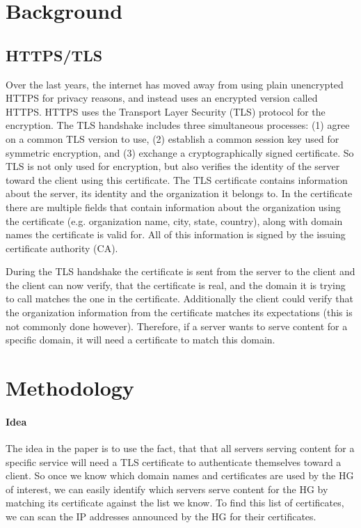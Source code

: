 \documentclass[sigconf,10pt,nonacm]{acmart}
\begin{document}
\section{Background}

\subsection{HTTPS/TLS}

Over the last years, the internet has moved away from using plain unencrypted HTTPS for privacy reasons, and instead uses an encrypted version called HTTPS. HTTPS uses the Transport Layer Security (TLS) protocol for the encryption. The TLS handshake includes three simultaneous processes: (1) agree on a common TLS version to use, (2) establish a common session key used for symmetric encryption, and (3) exchange a cryptographically signed certificate. So TLS is not only used for encryption, but also verifies the identity of the server toward the client using this certificate. The TLS certificate contains information about the server, its identity and the organization it belongs to. In the certificate there are multiple fields that contain information about the organization using the certificate (e.g. organization name, city, state, country), along with domain names the certificate is valid for. All of this information is signed by the issuing certificate authority (CA).

During the TLS handshake the certificate is sent from the server to the client and the client can now verify, that the certificate is real, and the domain it is trying to call matches the one in the certificate. Additionally the client could verify that the organization information from the certificate matches its expectations (this is not commonly done however). Therefore, if a server wants to serve content for a specific domain, it will need a certificate to match this domain.

\section{Methodology}

\paragraph{Idea}

The idea in the paper is to use the fact, that that all servers serving content for a specific service will need a TLS certificate to authenticate themselves toward a client. So once we know which domain names and certificates are used by the HG of interest, we can easily identify which servers serve content for the HG by matching its certificate against the list we know. To find this list of certificates, we can scan the IP addresses announced by the HG for their certificates.
\end{document}
